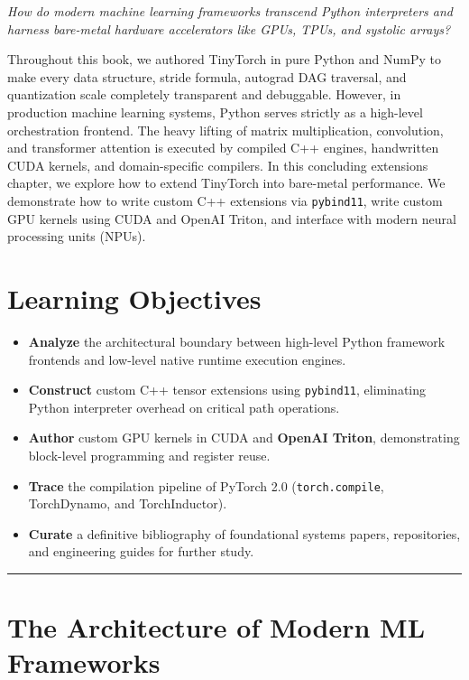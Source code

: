 \documentclass[
  letterpaper,
]{scrbook}
\providecommand{\tightlist}{%
  \setlength{\itemsep}{0pt}\setlength{\parskip}{0pt}}
\begin{document}

\emph{How do modern machine learning frameworks transcend Python
interpreters and harness bare-metal hardware accelerators like GPUs,
TPUs, and systolic arrays?}

Throughout this book, we authored TinyTorch in pure Python and NumPy to
make every data structure, stride formula, autograd DAG traversal, and
quantization scale completely transparent and debuggable. However, in
production machine learning systems, Python serves strictly as a
high-level orchestration frontend. The heavy lifting of matrix
multiplication, convolution, and transformer attention is executed by
compiled C++ engines, handwritten CUDA kernels, and domain-specific
compilers. In this concluding extensions chapter, we explore how to
extend TinyTorch into bare-metal performance. We demonstrate how to
write custom C++ extensions via \texttt{pybind11}, write custom GPU
kernels using CUDA and OpenAI Triton, and interface with modern neural
processing units (NPUs).

\section{Learning Objectives}\label{learning-objectives-21}

\begin{itemize}
\tightlist
\item
  \textbf{Analyze} the architectural boundary between high-level Python
  framework frontends and low-level native runtime execution engines.
\item
  \textbf{Construct} custom C++ tensor extensions using
  \texttt{pybind11}, eliminating Python interpreter overhead on critical
  path operations.
\item
  \textbf{Author} custom GPU kernels in CUDA and \textbf{OpenAI Triton},
  demonstrating block-level programming and register reuse.
\item
  \textbf{Trace} the compilation pipeline of PyTorch 2.0
  (\texttt{torch.compile}, TorchDynamo, and TorchInductor).
\item
  \textbf{Curate} a definitive bibliography of foundational systems
  papers, repositories, and engineering guides for further study.
\end{itemize}

\begin{center}\rule{0.5\linewidth}{0.5pt}\end{center}

\section{The Architecture of Modern ML
Frameworks}\label{the-architecture-of-modern-ml-frameworks}
\end{document}
